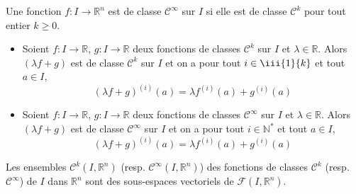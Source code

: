 \documentclass[french,11pt,twoside]{VcCours}
\begin{document}
\begin{Definition}{} Une fonction $f : I \rightarrow \mathbb{R}^n$ est de classe $\mathcal{C}^{\infty}$ sur $I$ si elle est de classe $\mathcal{C}^k$ pour tout entier $k \geq 0$.
\end{Definition}
%



\begin{Proposition}{} 
\begin{itemize}
\item Soient $f : I \rightarrow \mathbb{R}$, $g : I \rightarrow \mathbb{R}$ deux fonctions de classes $\mathcal{C}^k$ sur $I$ et $\lambda \in \mathbb{R}$. Alors $(\lambda f+g)$ est de classe $\mathcal{C}^k$ sur $I$ et on a pour tout $i \in  \iii{1}{k}$ et tout $a \in I$,
$$ (\lambda f+g)^{(i)}(a) = \lambda f^{(i)}(a) + g^{(i)}(a) $$
\item  Soient $f : I \rightarrow \mathbb{R}$, $g : I \rightarrow \mathbb{R}$ deux fonctions de classes $\mathcal{C}^{\infty}$ sur $I$ et $\lambda \in \mathbb{R}$. Alors $(\lambda f+g)$ est de classe $\mathcal{C}^{\infty}$ sur $I$ et on a pour tout $i \in \mathbb{N}^*$ et tout $a \in I$,
$$ (\lambda f+g)^{(i)}(a) = \lambda f^{(i)}(a) + g^{(i)}(a) $$
\end{itemize}
\end{Proposition}

\begin{Remarque}{} Les ensembles $\mathcal{C}^k(I, \mathbb{R}^n)$ (resp. $\mathcal{C}^{\infty}(I, \mathbb{R}^n)$) des fonctions de classes $\mathcal{C}^k$ (resp. $\mathcal{C}^{\infty}$) de $I$ dans $\mathbb{R}^n$ sont des sous-espaces vectoriels de $\mathcal{F}(I, \mathbb{R}^n)$.
\end{Remarque}
\end{document}
